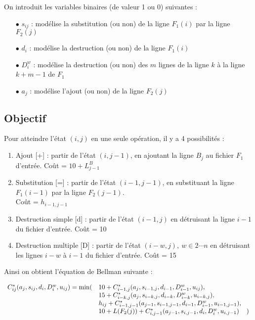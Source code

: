 \documentclass[a4paper, 10pt, french]{article}
\begin{document}
On introduit les variables binaires (de valeur 1 ou 0) suivantes :
\\

\begin{itemize}
\item[$\bullet$]
$s_{ij}$ : modélise la substitution (ou non) de la ligne $F_1(i)$ par la ligne $F_2(j)$
\\
\item[$\bullet$]
$d_i$ : modélise la destruction (ou non) de la ligne $F_1(i)$
\\
\item[$\bullet$]
$D_i^w$ : modélise la destruction (ou non) des $m$ lignes de la ligne $k$ à la ligne $k+m-1$ de $F_1$
\\
\item[$\bullet$]
$a_j$ : modélise l'ajout (ou non) de la ligne $F_2(j)$
\end{itemize}
\vspace{3mm}


\subsection*{Objectif}

Pour atteindre l'état $(i,j)$ en une seule opération, il y a 4 possibilités :
\begin{enumerate}
\item Ajout [+] : partir de l'état $(i,j-1)$, en ajoutant la ligne $B_j$ au fichier $F_1$ d'entrée. Coût = $10 + L_{j-1}^B$

\item Substitution [=] : partir de l'état $(i-1,j-1)$, en substituant la ligne $F_1(i-1)$ par la ligne $F_2(j-1)$.\\
Coût = $h_{i-1,j-1}$

\item Destruction simple [d] : partir de l'état $(i-1,j)$ en détruisant la ligne $i-1$ du fichier d'entrée. Coût = 10

\item Destruction multiple [D] : partir de l'état $(i-w,j),\ w \in 2 \cdots n$ en détruisant les lignes $i-w$ à $i-1$ du fichier d'entrée. Coût = 15
\end{enumerate}
\vspace{3mm}

Ainsi on obtient l'équation de Bellman suivante :

$$\begin{array}{rll}
C^*_{ij}(a_{j},s_{ij},d_{i},D_{i}^w, u_{ij}) = \min (
& 10 + C^*_{i-1,j}(a_{j},s_{i-1,j},d_{i-1},D_{i-1}^w, u_{ij}),\\
& 15 + C^*_{i-k,j}(a_{j},s_{i-k,j},d_{i-k},D_{i-k}^w, u_{i-k,j}),\\
& h_{ij} + C^*_{i-1,j-1}(a_{j-1},s_{i-1,j-1},d_{i-1},D_{i-1}^w, u_{i-1,j-1}),\\
& 10 + L(F_2(j)) + C^*_{i,j-1}(a_{j-1},s_{i,j-1},d_{i},D_{i}^w, u_{i,j-1}) \hspace{4mm} )
\end{array}$$

\end{document}
